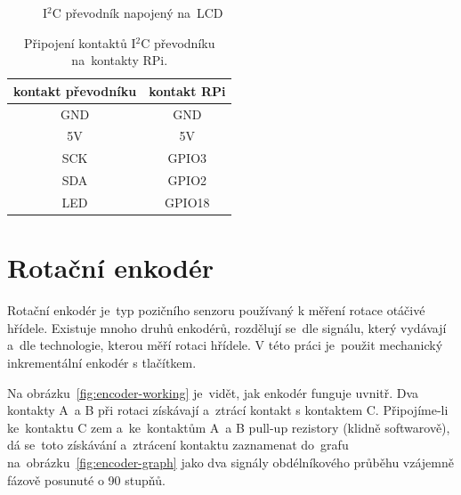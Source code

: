 \begin{figure}[htb]
\begin{minipage}{0.45\textwidth}
    \caption{\label{fig:LCD_back} I$^{2}$C převodník napojený na~LCD~\cite{laskakit-LCD}}
  \end{minipage}
\end{figure}

\begin{table}[htb]
  \centering
  \begin{tabular}{c|c}
    kontakt převodníku & kontakt RPi \\
    \hline
    GND                & GND         \\
    5V                 & 5V          \\
    SCK                & GPIO3       \\
    SDA                & GPIO2       \\
    LED                & GPIO18      \\
  \end{tabular}
  \caption{\label{tab:LCD_conn} Připojení kontaktů I$^{2}$C převodníku na~kontakty RPi.}
\end{table}


\section{Rotační enkodér~\cite{how-encoders-work}\cite{rotary-encoder-cvut}}
Rotační enkodér je~typ pozičního senzoru používaný k měření rotace otáčivé hřídele. Existuje mnoho druhů enkodérů, rozdělují se~dle signálu, který vydávají a~dle technologie, kterou měří rotaci hřídele. V této práci je~použit mechanický inkrementální enkodér s tlačítkem.

Na obrázku~\ref{fig:encoder-working} je~vidět, jak enkodér funguje uvnitř. Dva kontakty A~a B při rotaci získávají a~ztrácí kontakt s kontaktem C. Připojíme-li ke~kontaktu C zem a~ke~kontaktům A~a B pull-up rezistory (klidně softwarově), dá se~toto získávání a~ztrácení kontaktu zaznamenat do~grafu na~obrázku~\ref{fig:encoder-graph} jako dva signály obdélníkového průběhu vzájemně fázově posunuté o 90 stupňů.

